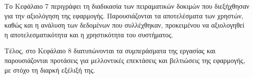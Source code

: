 		Το Κεφάλαιο 7 περιγράφει τη διαδικασία των πειραματικών δοκιμών που διεξήχθησαν για την αξιολόγηση της εφαρμογής. Παρουσιάζονται τα αποτελέσματα των χρηστών, καθώς και η ανάλυση των δεδομένων που συλλέχθηκαν, προκειμένου να αξιολογηθεί η αποτελεσματικότητα και η χρηστικότητα του συστήματος.

		Τέλος, στο Κεφάλαιο 8 διατυπώνονται τα συμπεράσματα της εργασίας και παρουσιάζονται προτάσεις για μελλοντικές επεκτάσεις και βελτιώσεις της εφαρμογής, με στόχο τη διαρκή εξέλιξή της.
